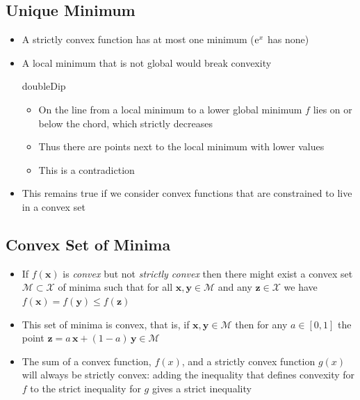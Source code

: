 \begin{slide}
\section[-1]{Unique Minimum}

\begin{PauseHighLight}
  \begin{itemize}
  \item A strictly convex function has at most one minimum (${\rm e}^{x}$
    has none)\pause
  \item A local minimum that is not global would break convexity\pause

    \begin{rightImage}{doubleDip}
      \begin{itemize}
      \item On the line from a local minimum to a lower global minimum
        $f$ lies on or below the chord, which strictly decreases\pause
      \item Thus there are points next to the local minimum with lower
        values\pause
      \item This is a contradiction\pause
      \end{itemize}
    \end{rightImage}

  \item This remains true if we consider convex functions that are
    constrained to live in a convex set\pause
  \end{itemize}
\end{PauseHighLight}

\end{slide}


\begin{slide}
\section{Convex Set of Minima}

\begin{PauseHighLight}
  \begin{itemize}
  \item If $f(\bm{x})$ is \emph{convex} but not \emph{strictly convex}
    then there might exist a convex set
    $\mathcal{M}\subset\mathcal{X}$ of minima such that for all
    $\bm{x}, \bm{y} \in \mathcal{M}$ and any $\bm{z} \in \mathcal{X}$
    we have $f(\bm{x})=f(\bm{y}) \leq f(\bm{z})$\pause
  \item This set of minima is convex, that is, if $\bm{x}, \bm{y}
    \in \mathcal{M}$ then for any $a\in[0,1]$ the point
    $\bm{z}=a\,\bm{x} + (1-a)\, \bm{y}\in \mathcal{M}$\pause
  \item The sum of a convex function, $f(x)$, and a strictly convex function
    $g(x)$ will always be strictly convex: adding the inequality that
    defines convexity for $f$ to the strict inequality for $g$ gives a
    strict inequality\pause
  \end{itemize}
\end{PauseHighLight}

\end{slide}


